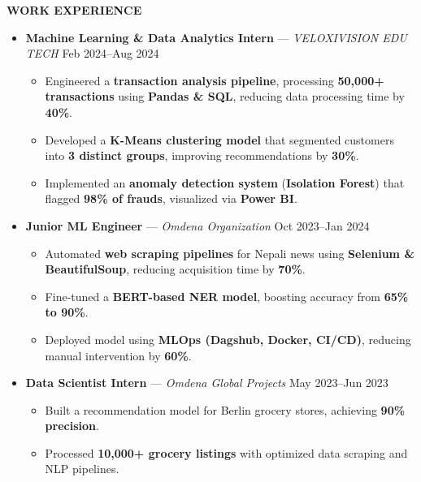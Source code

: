 \documentclass[a4paper,10pt]{article}
\newcommand{\resheading}[1]{%
  \vspace{1em}%
  \noindent\colorbox{mygrey}{%
    \parbox{\dimexpr\linewidth-2\fboxsep\relax}{%
      \textbf{#1}%
    }%
  }%
  \vspace{0.6em}%
}
\begin{document}
\resheading{WORK EXPERIENCE}
\vspace{0.4em}
\begin{itemize}
  \item \textbf{Machine Learning \& Data Analytics Intern} — \textit{VELOXIVISION EDU TECH} \hfill Feb 2024–Aug 2024
  \begin{itemize}
    \item Engineered a \textbf{transaction analysis pipeline}, processing \textbf{50,000+ transactions} using \textbf{Pandas \& SQL}, reducing data processing time by \textbf{40\%}.
    \item Developed a \textbf{K-Means clustering model} that segmented customers into \textbf{3 distinct groups}, improving recommendations by \textbf{30\%}.
    \item Implemented an \textbf{anomaly detection system} (\textbf{Isolation Forest}) that flagged \textbf{98\% of frauds}, visualized via \textbf{Power BI}.
  \end{itemize}

  \item \textbf{Junior ML Engineer} — \textit{Omdena Organization} \hfill Oct 2023–Jan 2024
  \begin{itemize}
    \item Automated \textbf{web scraping pipelines} for Nepali news using \textbf{Selenium \& BeautifulSoup}, reducing acquisition time by \textbf{70\%}.
    \item Fine-tuned a \textbf{BERT-based NER model}, boosting accuracy from \textbf{65\% to 90\%}.
    \item Deployed model using \textbf{MLOps (Dagshub, Docker, CI/CD)}, reducing manual intervention by \textbf{60\%}.
  \end{itemize}

  \item \textbf{Data Scientist Intern} — \textit{Omdena Global Projects} \hfill May 2023–Jun 2023
  \begin{itemize}
    \item Built a recommendation model for Berlin grocery stores, achieving \textbf{90\% precision}.
    \item Processed \textbf{10,000+ grocery listings} with optimized data scraping and NLP pipelines.
  \end{itemize}
\end{itemize}
\end{document}
